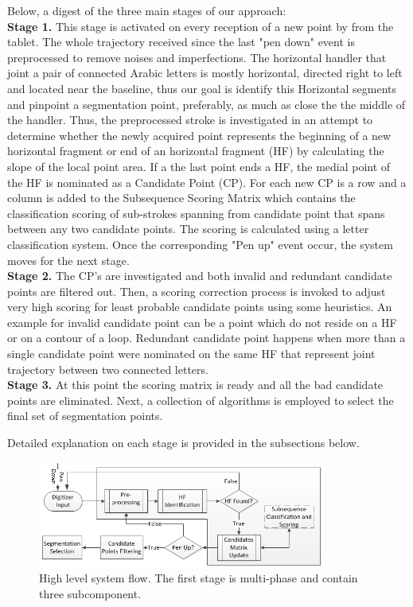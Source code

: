 \documentclass[journal,compsoc]{IEEEtran}
\begin{document}
Below, a digest of the three main stages of our approach: \\
\textbf{Stage 1.} This stage is activated on every reception of a new point by from the tablet. The whole trajectory received since the last "pen down" event is preprocessed to remove noises and imperfections. The horizontal handler that joint a pair of connected Arabic letters is mostly horizontal, directed right to left and located near the baseline, thus our goal is identify this Horizontal segments and pinpoint a segmentation point, preferably, as much as close the the middle of the handler. Thus, the preprocessed stroke is investigated in an attempt to determine whether the newly acquired point represents the beginning of a new horizontal fragment or end of an horizontal fragment (HF) by calculating the slope of the local point area. If a the last point ends a HF, the medial point of the HF is nominated as a Candidate Point (CP). For each new CP is a row and a column is added to the Subsequence Scoring Matrix which contains the classification scoring of sub-strokes spanning from candidate point that spans between any two candidate points. The scoring is calculated using a letter classification system. Once the corresponding "Pen up" event occur, the system moves for the next stage.\\ 
\textbf{Stage 2.} The CP's are investigated and both invalid and redundant candidate points are filtered out. Then, a scoring correction process is invoked to adjust very high scoring for least probable candidate points using some heuristics. An example for invalid candidate point can be a point which do not reside on a HF or on a contour of a loop. Redundant candidate point happens when more than a single candidate point were nominated on the same HF  that represent joint trajectory between two connected letters.\\
\textbf{Stage 3.} At this point the scoring matrix is ready and all the bad candidate points are eliminated. Next, a collection of algorithms is employed to select the final set of segmentation points.

Detailed explanation on each stage is provided in the subsections below.

\begin{figure}
\centering
\includegraphics[width=9.5cm]{./figures/system_flow}
\caption{High level system flow. The first stage is multi-phase and contain three subcomponent. }
\label{fig:system_flow}
\end{figure}
\end{document}
